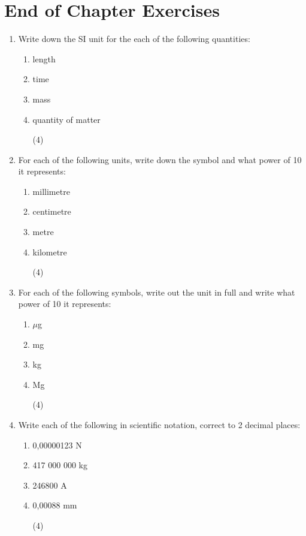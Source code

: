 \documentclass[10pt,a4paper,titlepage,twoside,openright]{report}
\begin{document}
\section{End of Chapter Exercises}
\begin{enumerate}

\item{Write down the SI unit for the each of the following quantities:
\begin{enumerate}
\item{length}
\item{time}
\item{mass}
\item{quantity of matter}
\begin{flushright}
(4)
\end{flushright}
\end{enumerate}}

\item{For each of the following units, write down the symbol and what power of 10 it represents:
\begin{enumerate}
\item{millimetre}
\item{centimetre}
\item{metre}
\item{kilometre}
\begin{flushright}
(4)
\end{flushright}
\end{enumerate}}

\item{For each of the following symbols, write out the unit in full and write what power of 10 it represents:
\begin{enumerate}
\item{$\mu$g}
\item{mg}
\item{kg}
\item{Mg}
\begin{flushright}
(4)
\end{flushright}
\end{enumerate}}

\item{Write each of the following in scientific notation, correct to 2 decimal places:
\begin{enumerate}
\item{0,00000123 N}
\item{417 000 000 kg}
\item{246800 A}
\item{0,00088 mm}
\begin{flushright}
(4)
\end{flushright}
\end {enumerate}}


\end{enumerate}
\end{document}
